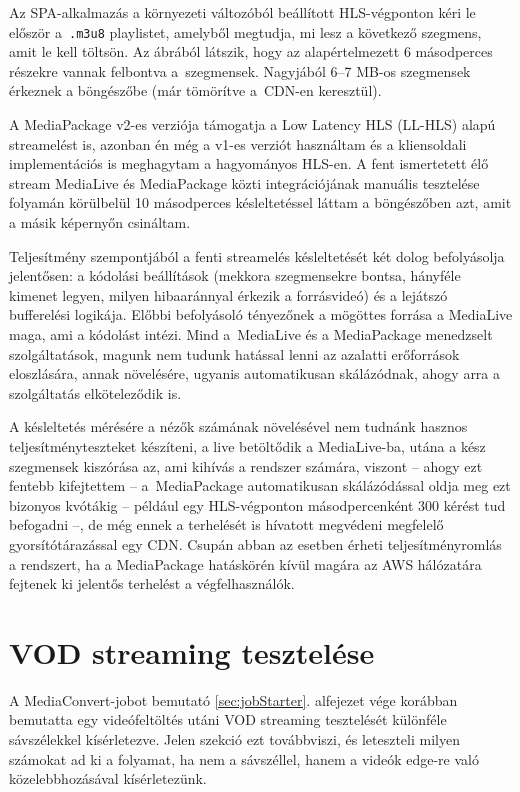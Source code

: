 Az SPA-alkalmazás a környezeti változóból beállított HLS-végponton kéri le először a~\verb|.m3u8| playlistet, amelyből megtudja, mi lesz a következő szegmens, amit le kell töltsön. Az ábrából látszik, hogy az alapértelmezett 6 másodperces részekre vannak felbontva a~szegmensek. Nagyjából 6--7 MB-os szegmensek érkeznek a böngészőbe (már tömörítve a~CDN-en keresztül).

A MediaPackage v2-es verziója támogatja a Low Latency HLS (LL-HLS) alapú streamelést is, azonban én még a v1-es verziót használtam és a kliensoldali implementációs is meghagytam a hagyományos HLS-en. A fent ismertetett élő stream MediaLive és MediaPackage közti integrációjának manuális tesztelése folyamán körülbelül 10 másodperces késleltetéssel láttam a böngészőben azt, amit a másik képernyőn csináltam.

Teljesítmény szempontjából a fenti streamelés késleltetését két dolog befolyásolja jelentősen: a kódolási beállítások (mekkora szegmensekre bontsa, hányféle kimenet legyen, milyen hibaaránnyal érkezik a forrásvideó) és a lejátszó bufferelési logikája. Előbbi befolyásoló tényezőnek a mögöttes forrása a MediaLive maga, ami a kódolást intézi. Mind a~MediaLive és a MediaPackage menedzselt szolgáltatások, magunk nem tudunk hatással lenni az azalatti erőforrások eloszlására, annak növelésére, ugyanis automatikusan skálázódnak, ahogy arra a szolgáltatás elköteleződik is.

A késleltetés mérésére a nézők számának növelésével nem tudnánk hasznos teljesítményteszteket készíteni, a live betöltődik a MediaLive-ba, utána a kész szegmensek kiszórása az, ami kihívás a rendszer számára, viszont -- ahogy ezt fentebb kifejtettem -- a~MediaPackage automatikusan skálázódással oldja meg ezt bizonyos kvótákig -- például egy HLS-végponton másodpercenként 300 kérést tud befogadni\cite{empQuotas} --, de még ennek a terhelését is hívatott megvédeni megfelelő gyorsítótárazással egy CDN. Csupán abban az esetben érheti teljesítményromlás a rendszert, ha a MediaPackage hatáskörén kívül magára az AWS hálózatára fejtenek ki jelentős terhelést a végfelhasználók.\cite{latency}

\section{VOD streaming tesztelése}\label{sec:vod_test}

A MediaConvert-jobot bemutató \ref{sec:jobStarter}. alfejezet vége korábban bemutatta egy videófeltöltés utáni VOD streaming tesztelését különféle sávszélekkel kísérletezve. Jelen szekció ezt továbbviszi, és leteszteli milyen számokat ad ki a folyamat, ha nem a sávszéllel, hanem a videók edge-re való közelebbhozásával kísérletezünk.

